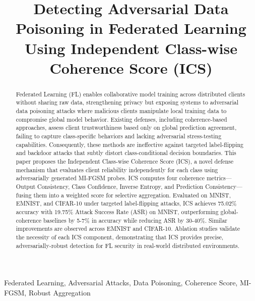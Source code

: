 \documentclass[conference]{IEEEtran}
\begin{document}
\title{Detecting Adversarial Data Poisoning in Federated Learning\\
Using Independent Class-wise Coherence Score (ICS)}

\author{
  \and
}


\maketitle

\begin{abstract}
Federated Learning (FL) enables collaborative model training across distributed clients without sharing raw data, strengthening privacy but exposing systems to adversarial data poisoning attacks where malicious clients manipulate local training data to compromise global model behavior. Existing defenses, including coherence-based approaches, assess client trustworthiness based only on global prediction agreement, failing to capture class-specific behaviors and lacking adversarial stress-testing capabilities. Consequently, these methods are ineffective against targeted label-flipping and backdoor attacks that subtly distort class-conditional decision boundaries. This paper proposes the Independent Class-wise Coherence Score (ICS), a novel defense mechanism that evaluates client reliability independently for each class using adversarially generated MI-FGSM probes. ICS computes four coherence metrics—Output Consistency, Class Confidence, Inverse Entropy, and Prediction Consistency—fusing them into a weighted score for selective aggregation. Evaluated on MNIST, EMNIST, and CIFAR-10 under targeted label-flipping attacks, ICS achieves 75.02\% accuracy with 19.75\% Attack Success Rate (ASR) on MNIST, outperforming global-coherence baselines by 5-7\% in accuracy while reducing ASR by 30-40\%. Similar improvements are observed across EMNIST and CIFAR-10. Ablation studies validate the necessity of each ICS component, demonstrating that ICS provides precise, adversarially-robust detection for FL security in real-world distributed environments.
\end{abstract}

\begin{IEEEkeywords}
Federated Learning, Adversarial Attacks, Data Poisoning, Coherence Score, MI-FGSM, Robust Aggregation
\end{IEEEkeywords}
\end{document}
